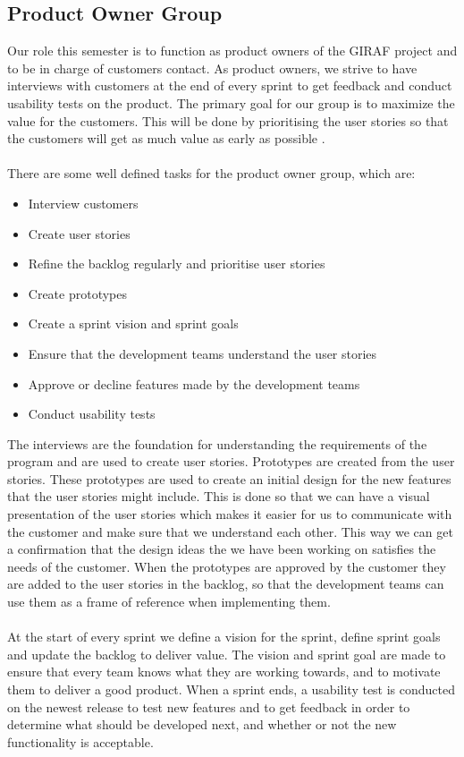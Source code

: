 \subsection{Product Owner Group}
Our role this semester is to function as product owners of the GIRAF project and to be in charge of customers contact. 
As product owners, we strive to have interviews with customers at the end of every sprint to get feedback and conduct usability tests on the product.
The primary goal for our group is to maximize the value for the customers. 
This will be done by prioritising the user stories so that the customers will get as much value as early as possible \autocite{TheScrumGuide}.\\
\\
There are some well defined tasks for the product owner group, which are:
\begin{itemize}
    \item Interview customers
    \item Create user stories    
    \item Refine the backlog regularly and prioritise user stories
    \item Create prototypes
    \item Create a sprint vision and sprint goals
    \item Ensure that the development teams understand the user stories
    \item Approve or decline features made by the development teams
    \item Conduct usability tests
\end{itemize}
\noindent
The interviews are the foundation for understanding the requirements of the program and are used to create user stories. 
Prototypes are created from the user stories.
These prototypes are used to create an initial design for the new features that the user stories might include. 
This is done so that we can have a visual presentation of the user stories which makes it easier for us to communicate with the customer and make sure that we understand each other. 
This way we can get a confirmation that the design ideas the we have been working on satisfies the needs of the customer.
When the prototypes are approved by the customer they are added to the user stories in the backlog, so that the development teams can use them as a frame of reference when implementing them.
\\\\
At the start of every sprint we define a vision for the sprint, define sprint goals and update the backlog to deliver value. 
The vision and sprint goal are made to ensure that every team knows what they are working towards, and to motivate them to deliver a good product.
When a sprint ends, a usability test is conducted on the newest release to test new features and to get feedback in order to determine what should be developed next, and whether or not the new functionality is acceptable.

